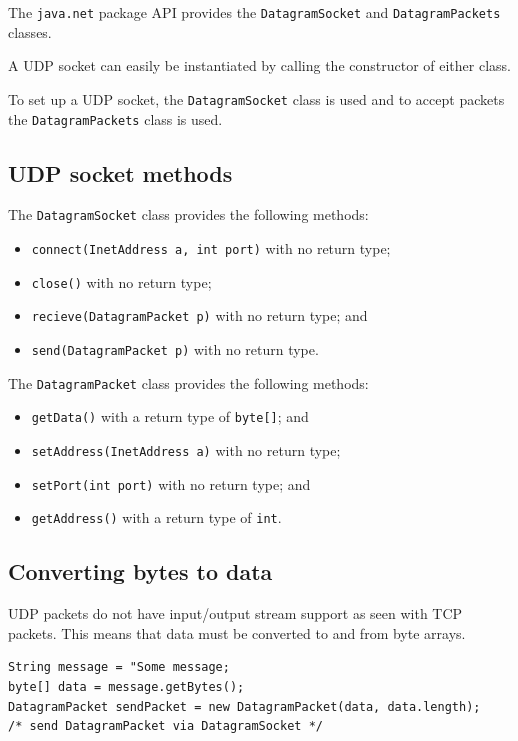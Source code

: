 \documentclass[a4paper]{systems-software}
\begin{document}
The \texttt{java.net} package API provides the \texttt{DatagramSocket} and \texttt{DatagramPackets} classes.

A UDP socket can easily be instantiated by calling the constructor of either class.

To set up a UDP socket, the \texttt{DatagramSocket} class is used and to accept packets the \texttt{DatagramPackets} class is used.


\subsection*{UDP socket methods}

The \texttt{DatagramSocket} class provides the following methods:
\begin{itemize}
	\item \texttt{connect(InetAddress a, int port)} with no return type;
	\item \texttt{close()} with no return type;
	\item \texttt{recieve(DatagramPacket p)} with no return type; and
	\item \texttt{send(DatagramPacket p)} with no return type.
\end{itemize}

The \texttt{DatagramPacket} class provides the following methods:
\begin{itemize}
	\item \texttt{getData()} with a return type of \texttt{byte[]}; and
	\item \texttt{setAddress(InetAddress a)} with no return type;
	\item \texttt{setPort(int port)} with no return type; and
	\item \texttt{getAddress()} with a return type of \texttt{int}.
\end{itemize}


\subsection*{Converting bytes to data}

UDP packets do not have input/output stream support as seen with TCP packets. This means that data must be converted to and from byte arrays.

\begin{lstlisting}[title={Client: sending a DatagramPacket.}]
String message = "Some message;
byte[] data = message.getBytes();
DatagramPacket sendPacket = new DatagramPacket(data, data.length);
/* send DatagramPacket via DatagramSocket */
\end{lstlisting}
\end{document}
